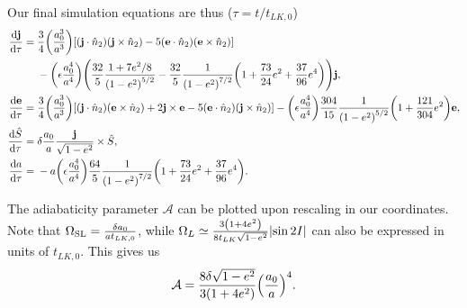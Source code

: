 \documentclass[11pt,
        usenames, %
        dvipsnames %
    ]{article}
\newcommand*{\rd}[2]{\frac{\mathrm{d}#1}{\mathrm{d}#2}}
\newcommand*{\bm}[1]{\boldsymbol{\mathbf{#1}}}
\DeclarePairedDelimiter\abs{\lvert}{\rvert}
\DeclarePairedDelimiter\p{\lparen}{\rparen}
\DeclarePairedDelimiter\s{\lbrack}{\rbrack}
\begin{document}
Our final simulation equations are thus ($\tau = t / t_{LK, 0}$)
\begin{align}
    \rd{\bm{j}}{\tau} ={}& \frac{3}{4}\p*{\frac{a_0^3}{a^3}} \s*{
        \p*{\bm{j} \cdot \hat{n}_2} \p*{\bm{j} \times \hat{n}_2}
        - 5\p*{\bm{e} \cdot \hat{n}_2}\p*{\bm{e} \times \hat{n}_2}
        }\nonumber\\
        &- \p*{\epsilon \frac{a_0^4}{a^4}}\p*{
            \frac{32}{5}
                \frac{1 + 7e^2/8}{\p*{1 - e^2}^{5/2}}
            - \frac{32}{5} \frac{1}{\p*{1 - e^2}^{7/2}}\p*{1 + \frac{73}{24}e^2
                    + \frac{37}{96}e^4}
            }\bm{j},\\
    \rd{\bm{e}}{\tau} ={}&
        \frac{3}{4}\p*{\frac{a_0^3}{a^3}} \s*{
            \p*{\bm{j} \cdot \hat{n}_2} \p*{\bm{e} \times \hat{n}_2}
            + 2\bm{j} \times \bm{e}
            - 5\p*{\bm{e} \cdot \hat{n}_2}\p*{\bm{j} \times \hat{n}_2}
            }
        -
            \p*{\epsilon\frac{a_0^4}{a^4}}
            \frac{304}{15}
            \frac{1}{\p*{1 - e^2}^{5/2}}
            \p*{1 + \frac{121}{304} e^2}\bm{e},\\
    \rd{\hat{S}}{\tau} ={}& \delta \frac{a_0}{a}
        \frac{\bm{j}}{\sqrt{1 - e^2}} \times \hat{S},\\
    \rd{a}{\tau} ={}& -a\p*{\epsilon\frac{a_0^4}{a^4}}
        \frac{64}{5} \frac{1}{\p*{1 - e^2}^{7/2}}\p*{1 + \frac{73}{24}e^2
            + \frac{37}{96}e^4}.
\end{align}

The adiabaticity parameter $\mathcal{A}$ can be plotted upon rescaling in our
coordinates. Note that $\Omega_{\rm SL} = \frac{\delta a_0}{at_{LK, 0}}$, while
$\Omega_L \simeq \frac{3\p*{1 + 4e^2}}{8t_{LK}\sqrt{1 - e^2}}\abs*{\sin 2I}$ can
also be expressed in units of $t_{LK, 0}$. This gives us
\begin{equation}
    \mathcal{A} = \frac{8\delta \sqrt{1 - e^2}}{3\p*{1 +
        4e^2}}\p*{\frac{a_0}{a}}^4.
\end{equation}
\end{document}
